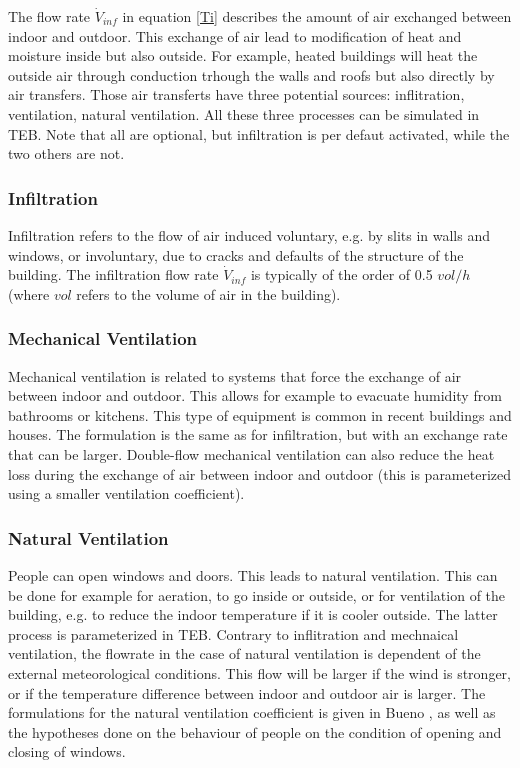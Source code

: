 The flow rate $\dot{V}_{inf}$ in equation \ref{Ti} describes the amount of air exchanged between indoor and outdoor. This exchange of air lead to modification of heat and moisture inside but also outside. For example, heated buildings will heat the outside air through conduction trhough the walls and roofs but also directly by air transfers. Those air transferts have three potential sources: inflitration, ventilation, natural ventilation. All these three processes can be simulated in TEB. Note that all are optional, but infiltration is per defaut activated, while the two others are not. \\

\subsubsection{Infiltration}

Infiltration refers to the flow of air induced voluntary, e.g. by slits in walls and windows, or involuntary, due to cracks and defaults of the structure of the building. The infiltration flow rate $\dot{V}_{inf}$ is typically of the order of 0.5 $vol/h$ (where $vol$ refers to the volume of air in the building). \\


\subsubsection{Mechanical Ventilation}

Mechanical ventilation is related to systems that force the exchange of air between indoor and outdoor. This allows for example to evacuate humidity from bathrooms or kitchens. This type of equipment is common in recent buildings and houses. The formulation is the same as for infiltration, but with an exchange rate that can be larger. Double-flow mechanical ventilation can also reduce the heat loss during the exchange of air between indoor and outdoor (this is parameterized using a smaller ventilation coefficient). \\

\subsubsection{Natural Ventilation}

People can open windows and doors. This leads to natural ventilation. This can be done for example for aeration, to go inside or outside, or for ventilation of the building, e.g. to reduce the indoor temperature if it is cooler outside. The latter process is parameterized in TEB. Contrary to inflitration and mechnaical ventilation, the flowrate in the case of natural ventilation is dependent of the external meteorological conditions. This flow will be larger if the wind is stronger, or if the temperature difference between indoor and outdoor air is larger. The formulations for the natural ventilation coefficient is given in Bueno \nocite{bueno2012}, as well as the hypotheses done on the behaviour of people on the condition of opening and closing of windows. \\



